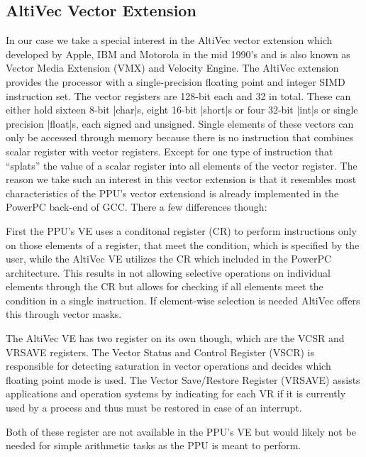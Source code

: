 \subsection{AltiVec Vector Extension}
In our case we take a special interest in the AltiVec vector extension which developed by Apple, IBM and Motorola in the mid 1990's and is also known as Vector Media Extension (VMX) and Velocity Engine. 
The AltiVec extension provides the processor with a single-precision floating point and integer SIMD instruction set.
The vector registers are 128-bit each and 32 in total. 
These can either hold sixteen 8-bit |char|s, eight 16-bit |short|s or four 32-bit |int|s or single precision |float|s, each signed and unsigned.
Single elements of these vectors can only be accessed through memory because there is no instruction that combines scalar register with vector registers.
Except for one type of instruction that ``splats'' the value of a scalar register into all elements of the vector register.
The reason we take such an interest in this vector extension is that it resembles most characteristics of the PPU's vector extensiond is already implemented in the PowerPC back-end of GCC.
There a few differences though:
\begin{addmargin}[2em]{0em}
    First the PPU's VE uses a conditonal register (CR) to perform instructions only on those elements of a register, that meet the condition, which is specified by the user, while the AltiVec VE utilizes the CR which included in the PowerPC architecture.
    This results in not allowing selective operations on individual elements through the CR but allows for checking if all elements meet the condition in a single instruction.
    If element-wise selection is needed AltiVec offers this through vector masks.
    
    The AltiVec VE has two register on its own though, which are the VCSR and VRSAVE registers.
            The Vector Status and Control Register (VSCR) is responsible for detecting saturation in vector operations and decides which floating point mode is used.
            The Vector Save/Restore Register (VRSAVE) assists applications and operation systems by indicating for each VR if it is currently used by a process and thus must be restored in case of an interrupt.
    
    Both of these register are not available in the PPU's VE but would likely not be needed for simple arithmetic tasks as the PPU is meant to perform.
\end{addmargin}
    
